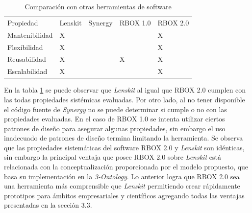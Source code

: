  
\begin{table}[H]
\caption{Comparación con otras herramientas de software}
\label{tabla:comparacionotrasherramientas}
\begin{center}
	\begin{tabular}{|>{\centering\arraybackslash}p{3cm}  | >{\centering\arraybackslash}p{2cm}  |>{\centering\arraybackslash}p{2cm} |>{\centering\arraybackslash}p{2cm} |>{\centering\arraybackslash}p{2cm} |}
	\hline	& \multicolumn{4}{c|}{Herramientas de software} \\	
	
	\hline Propiedad	 				 				& Lenskit  & 
	Synergy & RBOX 1.0 & RBOX 2.0 \\ 
	\hline Mantenibilidad 		 				& X &   &   & X  \\ 
	\hline Flexibilidad 						& X &   &   & X \\ 
	\hline Reusabilidad 						& X &   & X & X \\ 
	\hline Escalabilidad						& X &   &   & X \\ 
	\hline 
	\end{tabular} 
\end{center}
\end{table}

En la tabla \ref{tabla:comparacionotrasherramientas} se puede observar que \textit{Lenskit} al igual que RBOX 2.0 cumplen con las todas propiedades sistémicas evaluadas. Por otro lado, al no tener disponible el código fuente de \textit{Synergy} no se puede determinar si cumple o no con las propiedades evaluadas. En el caso de RBOX 1.0 se intenta utilizar ciertos patrones de diseño para asegurar algunas propiedades, sin embargo el uso inadecuado de patrones de diseño termina limitando la herramienta. Se observa que las propiedades sistemáticas del software RBOX 2.0 y \textit{Lenskit} son idénticas, sin embargo la principal ventaja que posee RBOX 2.0 sobre \textit{Lenskit} está relacionada con la conceptualización proporcionada por el modelo propuesto, que basa su implementación en la \textit{3-Ontology}. Lo anterior logra que RBOX 2.0 sea una herramienta más comprensible que \textit{Lenskit} permitiendo crear rápidamente prototipos para ámbitos empresariales y científicos agregando todas las ventajas presentadas en la sección 3.3. 


%





